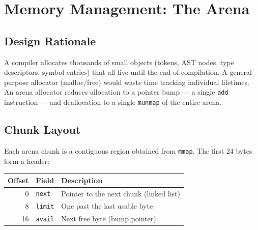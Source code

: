\documentclass[11pt,a4paper,twoside,openright,DIV=15]{scrbook}
\theoremstyle{definition}
\theoremstyle{plain}
\theoremstyle{remark}
\begin{document}
\chapter{Memory Management: The Arena}
\label{ch:arena}

\section{Design Rationale}

A compiler allocates thousands of small objects (tokens, AST nodes,
type descriptors, symbol entries) that all live until the end of
compilation.  A general-purpose allocator (malloc/free) would waste
time tracking individual lifetimes.  An arena allocator reduces
allocation to a pointer bump --- a single \texttt{add} instruction ---
and deallocation to a single \texttt{munmap} of the entire arena.

\section{Chunk Layout}

Each arena chunk is a contiguous region obtained from \texttt{mmap}.
The first 24 bytes form a header:

\begin{center}
\begin{tabular}{rll}
\hline
Offset & Field & Description \\
\hline
0  & \texttt{next}  & Pointer to the next chunk (linked list) \\
8  & \texttt{limit} & One past the last usable byte \\
16 & \texttt{avail} & Next free byte (bump pointer) \\
\hline
\end{tabular}
\end{center}
\end{document}
